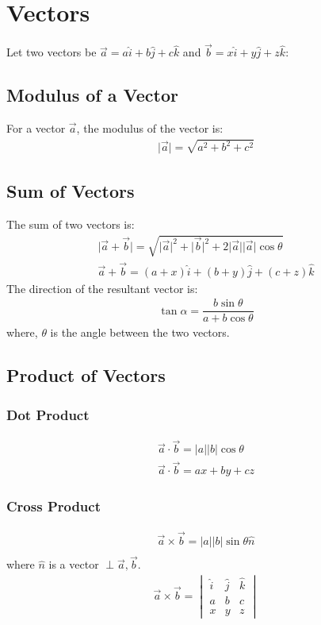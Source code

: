 \documentclass[../main.tex]{subfiles}
\begin{document}
    \chapter{Vectors}
    Let two vectors be $\vec{a}=a\hat{i}+b\hat{j}+c\hat{k}$ and $\vec{b}=x\hat{i}+y\hat{j}+z\hat{k}$:
    \section{Modulus of a Vector}
    For a vector $\vec{a}$, the modulus of the vector is:
    \begin{align}
        \lvert \vec{a} \rvert = \sqrt{a^2+b^2+c^2}
    \end{align}

    \section{Sum of Vectors}
    The sum of two vectors is:
    \begin{align}
        \lvert \vec{a}+\vec{b} \rvert=\sqrt{\lvert \vec{a} \rvert^2+\lvert \vec{b} \rvert^2+2\lvert \vec{a} \rvert \lvert \vec{a} \rvert\cos \theta}\\
        \vec{a}+\vec{b}=(a+x)\hat{i}+(b+y)\hat{j}+(c+z)\hat{k}
    \end{align}
    The direction of the resultant vector is:
    \begin{align}
        \tan \alpha=\dfrac{b\sin\theta}{a+b\cos\theta}
    \end{align}
    where, $\theta$ is the angle between the two vectors.

    \section{Product of Vectors}
    \subsection{Dot Product}
    \begin{align}
        \vec{a}\cdot\vec{b}=\lvert a \rvert \lvert b \rvert\cos\theta\\
        \vec{a}\cdot\vec{b}=ax+by+cz
    \end{align}

    \subsection{Cross Product}
    \begin{align}
        \vec{a}\times\vec{b}=\lvert a \rvert \lvert b \rvert \sin\theta \hat{n}\\
    \end{align}
    where $\hat{n}$ is a vector $\perp\vec{a},\vec{b}$.
    \begin{align}
        \vec{a}\times\vec{b}=
            \begin{vmatrix}
            \hat{i}&\hat{j}&\hat{k}\\
            a&b&c\\
            x&y&z
            \end{vmatrix}
    \end{align}
\end{document}
